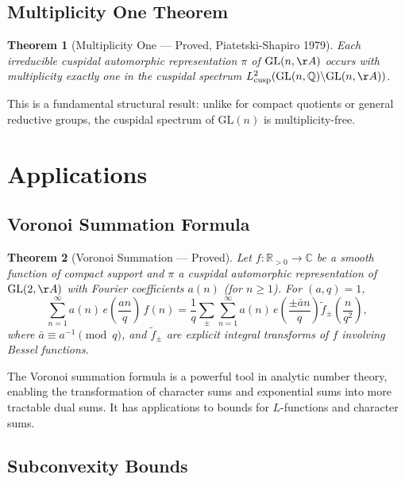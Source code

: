 \documentclass[12pt,a4paper]{amsart}
\newtheorem{theorem}{Theorem}[section]
\theoremstyle{definition}
\newcommand{\QQ}{\mathbb{Q}}
\newcommand{\RR}{\mathbb{R}}
\newcommand{\CC}{\mathbb{C}}
\newcommand{\GL}{\mathrm{GL}}
\begin{document}
\subsection{Multiplicity One Theorem}

\begin{theorem}[Multiplicity One — Proved, Piatetski-Shapiro 1979]
Each irreducible cuspidal automorphic representation $\pi$ of $\GL(n,\AA)$
occurs with multiplicity exactly one in the cuspidal spectrum
$L^2_{\mathrm{cusp}}(\GL(n,\QQ) \backslash \GL(n,\AA))$.
\end{theorem}

This is a fundamental structural result: unlike for compact quotients or general
reductive groups, the cuspidal spectrum of $\GL(n)$ is multiplicity-free.

\section{Applications}
\label{sec:applications}

\subsection{Voronoi Summation Formula}

\begin{theorem}[Voronoi Summation — Proved]
\label{thm:voronoi}
Let $f : \RR_{>0} \to \CC$ be a smooth function of compact support and
$\pi$ a cuspidal automorphic representation of $\GL(2,\AA)$ with
Fourier coefficients $a(n)$ (for $n \geq 1$). For $(a, q) = 1$,
\[
\sum_{n=1}^\infty a(n)\, e\!\left(\frac{an}{q}\right)\, f(n)
= \frac{1}{q} \sum_{\pm} \sum_{n=1}^\infty a(n)\, e\!\left(\frac{\pm \bar a n}{q}\right) \tilde f_\pm\!\!\left(\frac{n}{q^2}\right),
\]
where $\bar a \equiv a^{-1} \pmod{q}$, and $\tilde f_\pm$ are explicit integral
transforms of $f$ involving Bessel functions.
\end{theorem}

The Voronoi summation formula is a powerful tool in analytic number theory,
enabling the transformation of character sums and exponential sums into more
tractable dual sums. It has applications to bounds for $L$-functions and
character sums.

\subsection{Subconvexity Bounds}
\end{document}

